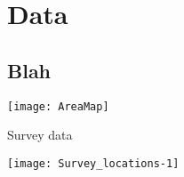 \documentclass[xcolor=x11names,compress]{beamer}
\renewcommand{\(}{\begin{columns}}
\renewcommand{\)}{\end{columns}}
\newcommand{\<}[1]{\begin{column}{#1}}
\renewcommand{\>}{\end{column}}
\begin{document}

	


	










	


\section{Data}
\subsection{Blah}

\begin{frame}{}

\centering
\texttt{[image: AreaMap]}

\end{frame}

\begin{frame}{Survey data}

\centering
\texttt{[image: Survey\_locations-1]}

\end{frame}
\end{document}
